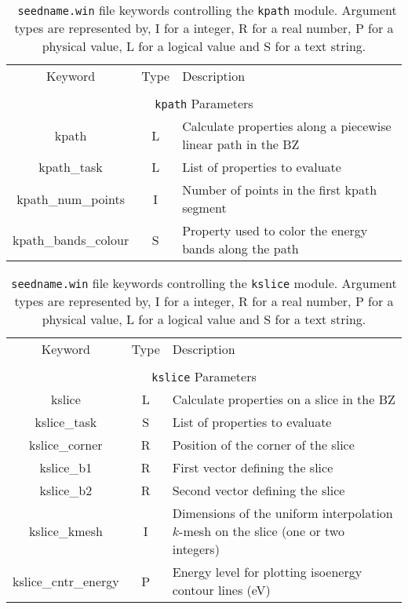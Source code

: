 \begin{table}[hH!]
\begin{center}
\begin{tabular}{|c|c|p{6cm}|}
  \hline
  Keyword & Type & Description \\
  &      &             \\
  \hline\hline
  \multicolumn{3}{|c|}{{\tt kpath} Parameters} \\
  \hline
  {\sc kpath}  & L & Calculate properties along a piecewise linear path in the BZ \\
  {\sc kpath\_task}& L & List of properties to evaluate\\
  {\sc kpath\_num\_points}& I & Number of points in the first kpath segment\\
  {\sc kpath\_bands\_colour}& S & Property used to color the energy bands along the path\\
  \hline
\end{tabular}
\caption[Parameter file keywords controlling the kpath module.]  {{\tt
    seedname.win} file keywords controlling the {\tt kpath}
  module. Argument types are represented by, I for a integer, R for a
  real number, P for a physical value, L for a logical value and S for
  a text string.}
\label{parameter_keywords_kpath}
\end{center}
\end{table}

\begin{table}[hH!]
\begin{center}
\begin{tabular}{|c|c|p{6cm}|}
  \hline
  Keyword & Type & Description \\
  &      &             \\
  \hline\hline
  \multicolumn{3}{|c|}{{\tt kslice} Parameters} \\
  \hline
  {\sc kslice}  & L & Calculate properties on a slice in the BZ \\
  {\sc kslice\_task}& S & List of properties to evaluate\\
  {\sc kslice\_corner}& R & Position of the corner of the slice\\
  {\sc kslice\_b1}& R & First vector defining the slice\\
  {\sc kslice\_b2}& R & Second vector defining the slice\\
  {\sc kslice\_kmesh}& I & Dimensions of the uniform interpolation 
$k$-mesh on the slice (one or two integers)\\
  {\sc kslice\_cntr\_energy}& P & Energy level for  plotting 
isoenergy contour lines (eV)\\
  \hline
\end{tabular}
\caption[Parameter file keywords controlling the kslice module.]
{{\tt seedname.win} file keywords controlling the {\tt kslice}
  module. Argument types are represented by, I for a integer, R for a
  real number, P for a physical value, L for a logical value and S for
  a text string.}
\label{parameter_keywords_kslice}
\end{center}
\end{table}



